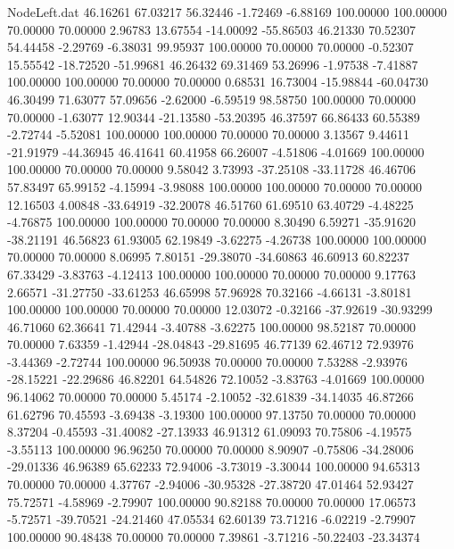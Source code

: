 \begin{filecontents}{NodeLeft.dat}
  46.16261   67.03217   56.32446    -1.72469   -6.88169  100.00000  100.00000   70.00000   70.00000    2.96783   13.67554  -14.00092  -55.86503
  46.21330   70.52307   54.44458    -2.29769   -6.38031   99.95937  100.00000   70.00000   70.00000   -0.52307   15.55542  -18.72520  -51.99681
  46.26432   69.31469   53.26996    -1.97538   -7.41887  100.00000  100.00000   70.00000   70.00000    0.68531   16.73004  -15.98844  -60.04730
  46.30499   71.63077   57.09656    -2.62000   -6.59519   98.58750  100.00000   70.00000   70.00000   -1.63077   12.90344  -21.13580  -53.20395
  46.37597   66.86433   60.55389    -2.72744   -5.52081  100.00000  100.00000   70.00000   70.00000    3.13567    9.44611  -21.91979  -44.36945
  46.41641   60.41958   66.26007    -4.51806   -4.01669  100.00000  100.00000   70.00000   70.00000    9.58042    3.73993  -37.25108  -33.11728
  46.46706   57.83497   65.99152    -4.15994   -3.98088  100.00000  100.00000   70.00000   70.00000   12.16503    4.00848  -33.64919  -32.20078
  46.51760   61.69510   63.40729    -4.48225   -4.76875  100.00000  100.00000   70.00000   70.00000    8.30490    6.59271  -35.91620  -38.21191
  46.56823   61.93005   62.19849    -3.62275   -4.26738  100.00000  100.00000   70.00000   70.00000    8.06995    7.80151  -29.38070  -34.60863
  46.60913   60.82237   67.33429    -3.83763   -4.12413  100.00000  100.00000   70.00000   70.00000    9.17763    2.66571  -31.27750  -33.61253
  46.65998   57.96928   70.32166    -4.66131   -3.80181  100.00000  100.00000   70.00000   70.00000   12.03072   -0.32166  -37.92619  -30.93299
  46.71060   62.36641   71.42944    -3.40788   -3.62275  100.00000   98.52187   70.00000   70.00000    7.63359   -1.42944  -28.04843  -29.81695
  46.77139   62.46712   72.93976    -3.44369   -2.72744  100.00000   96.50938   70.00000   70.00000    7.53288   -2.93976  -28.15221  -22.29686
  46.82201   64.54826   72.10052    -3.83763   -4.01669  100.00000   96.14062   70.00000   70.00000    5.45174   -2.10052  -32.61839  -34.14035
  46.87266   61.62796   70.45593    -3.69438   -3.19300  100.00000   97.13750   70.00000   70.00000    8.37204   -0.45593  -31.40082  -27.13933
  46.91312   61.09093   70.75806    -4.19575   -3.55113  100.00000   96.96250   70.00000   70.00000    8.90907   -0.75806  -34.28006  -29.01336
  46.96389   65.62233   72.94006    -3.73019   -3.30044  100.00000   94.65313   70.00000   70.00000    4.37767   -2.94006  -30.95328  -27.38720
  47.01464   52.93427   75.72571    -4.58969   -2.79907  100.00000   90.82188   70.00000   70.00000   17.06573   -5.72571  -39.70521  -24.21460
  47.05534   62.60139   73.71216    -6.02219   -2.79907  100.00000   90.48438   70.00000   70.00000    7.39861   -3.71216  -50.22403  -23.34374

\end{filecontents}

